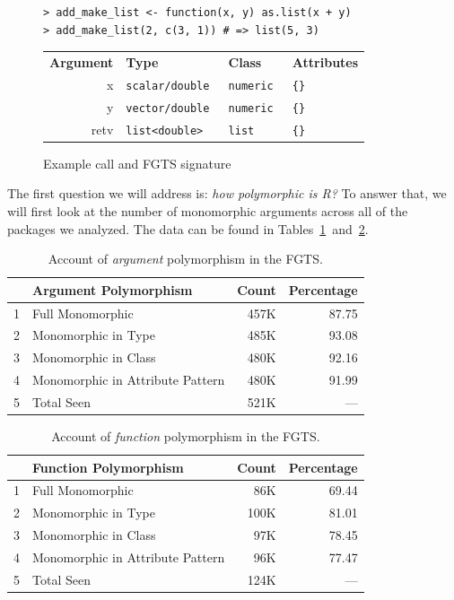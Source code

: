 \documentclass[acmsmall,10pt,review,anonymous]{acmart}\settopmatter{printfolios=true,printccs=false,printacmref=false}
\begin{document}
\begin{figure}[!hb]{\small\begin{lstlisting}[style=R]
> add_make_list <- function(x, y) as.list(x + y)
> add_make_list(2, c(3, 1)) # => list(5, 3)
\end{lstlisting}}
\begin{tabular}{@{}r|l|l|l@{}}\hline
\bf Argument & \bf Type & \bf Class &\bf Attributes \\
x & \tt scalar/double & \tt numeric & \tt \{\} \\
y & \tt vector/double & \tt numeric & \tt \{\} \\
retv & \tt list<double> & \tt list & \tt \{\}  
\end{tabular}
\caption{Example call and FGTS signature}\label{fig:exFGTS}\end{figure}

The first question we will address is: {\it how polymorphic is R?}  To
answer that, we will first look at the number of monomorphic arguments
across all of the packages we analyzed.  The data can be found in
Tables~\ref{tab:argcountsFGTS}~and~\ref{tab:funcountsFGTS}.

\begin{table}[ht]
\label{tab:argcountsFGTS}
\centering
\begin{tabular}{rlrr}
  \hline
 & Argument Polymorphism & Count & Percentage \\ 
  \hline
1 & Full Monomorphic & 457K & 87.75 \\ 
  2 & Monomorphic in Type & 485K & 93.08 \\ 
  3 & Monomorphic in Class & 480K & 92.16 \\ 
  4 & Monomorphic in Attribute Pattern & 480K & 91.99 \\ 
  5 & Total Seen & 521K & --- \\ 
     \hline
\end{tabular}
\caption{Account of {\it argument} polymorphism in the FGTS.}
\end{table}

\begin{table}[ht]
\label{tab:funcountsFGTS}
\centering
\begin{tabular}{rlrr}
  \hline
 & Function Polymorphism & Count & Percentage \\ 
  \hline
1 & Full Monomorphic & 86K & 69.44 \\ 
  2 & Monomorphic in Type & 100K & 81.01 \\ 
  3 & Monomorphic in Class & 97K & 78.45 \\ 
  4 & Monomorphic in Attribute Pattern & 96K & 77.47 \\ 
  5 & Total Seen & 124K & --- \\ 
   \hline
\end{tabular}
\caption{Account of {\it function} polymorphism in the FGTS.}
\end{table}
\end{document}
